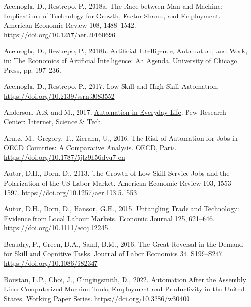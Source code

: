 \documentclass[
  11,
  a4paperpaper,
]{article}
\newlength{\cslhangindent}
\newenvironment{CSLReferences}[2] %
 {\begin{list}{}{%
  \setlength{\itemindent}{0pt}
  \setlength{\leftmargin}{0pt}
  \setlength{\parsep}{0pt}
  \ifodd #1
   \setlength{\leftmargin}{\cslhangindent}
   \setlength{\itemindent}{-1\cslhangindent}
  \fi
  \setlength{\itemsep}{#2\baselineskip}}}
 {\end{list}}
\begin{document}
\begin{CSLReferences}{1}{0}
Acemoglu, D., Restrepo, P., 2018a. The {Race} between {Man} and
{Machine}: {Implications} of {Technology} for {Growth}, {Factor}
{Shares}, and {Employment}. American Economic Review 108, 1488--1542.
\url{https://doi.org/10.1257/aer.20160696}

Acemoglu, D., Restrepo, P., 2018b.
\href{https://www.nber.org/books-and-chapters/economics-artificial-intelligence-agenda/artificial-intelligence-automation-and-work}{Artificial
{Intelligence}, {Automation}, and {Work}}, in: The {Economics} of
{Artificial} {Intelligence}: {An} {Agenda}. University of Chicago Press,
pp. 197--236.

Acemoglu, D., Restrepo, P., 2017. Low-{Skill} and {High}-{Skill}
{Automation}. \url{https://doi.org/10.2139/ssrn.3083552}

Anderson, A.S. and M., 2017.
\href{https://www.pewresearch.org/internet/2017/10/04/automation-in-everyday-life/}{Automation
in {Everyday} {Life}}. Pew Research Center: Internet, Science \& Tech.

Arntz, M., Gregory, T., Zierahn, U., 2016. The {Risk} of {Automation}
for {Jobs} in {OECD} {Countries}: {A} {Comparative} {Analysis}. OECD,
Paris. \url{https://doi.org/10.1787/5jlz9h56dvq7-en}

Autor, D.H., Dorn, D., 2013. The {Growth} of {Low}-{Skill} {Service}
{Jobs} and the {Polarization} of the {US} {Labor} {Market}. American
Economic Review 103, 1553--1597.
\url{https://doi.org/10.1257/aer.103.5.1553}

Autor, D.H., Dorn, D., Hanson, G.H., 2015. Untangling {Trade} and
{Technology}: {Evidence} from {Local} {Labour} {Markets}. Economic
Journal 125, 621--646. \url{https://doi.org/10.1111/ecoj.12245}

Beaudry, P., Green, D.A., Sand, B.M., 2016. The {Great} {Reversal} in
the {Demand} for {Skill} and {Cognitive} {Tasks}. Journal of Labor
Economics 34, S199--S247. \url{https://doi.org/10.1086/682347}

Boustan, L.P., Choi, J., Clingingsmith, D., 2022. Automation {After} the
{Assembly} {Line}: {Computerized} {Machine} {Tools}, {Employment} and
{Productivity} in the {United} {States}. Working {Paper} {Series}.
\url{https://doi.org/10.3386/w30400}


\end{CSLReferences}
\end{document}

